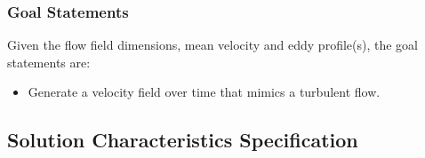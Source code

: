 \documentclass[12pt]{article}
\newcounter{goalnum} %
\begin{document}
\subsubsection{Goal Statements}


\noindent Given the flow field dimensions, mean velocity and eddy profile(s), the goal statements are:

\begin{itemize}

\item[GS\refstepcounter{goalnum}\thegoalnum \label{G_anyFlowField}:] Generate a velocity field over time that mimics a turbulent flow.


\end{itemize}

\subsection{Solution Characteristics Specification} \label{sec_solSpec}

\end{document}
